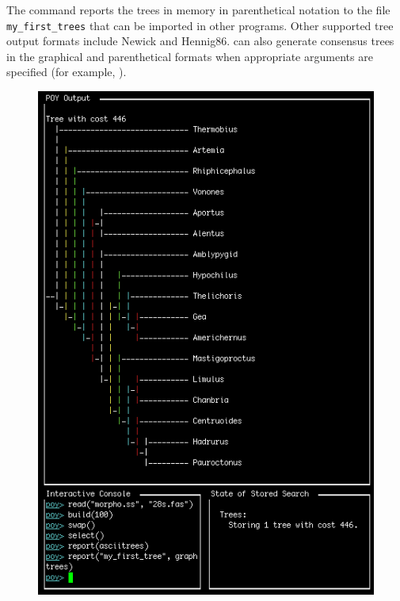 {The command  reports the trees in memory in parenthetical 
notation to the file \texttt{my\_first\_trees} that can be imported in other programs. Other supported tree output 
formats include Newick and Hennig86.  can also generate consensus trees in the graphical 
and parenthetical formats when appropriate arguments are specified (for example, ).

\begin{figure}
\centering
\begin{minipage}[c]{0.45\textwidth}
   		\includegraphics[width=\textwidth]{doc/figures/asciitree.jpg}
\end{minipage}
\,
\begin{minipage}[c]{0.5\textwidth}

\end{minipage}
\end{figure}}
